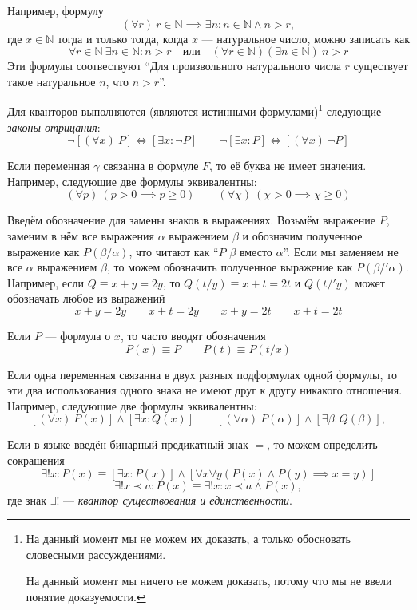 Например, формулу
\newcommand\N{\mathbb N}
\begin{equation}\label{eq:nat_unbound}
  (\forall r)~r\in\N\implies \exists n:n\in\N\land n>r,
\end{equation}
где $x\in\N$ тогда и только тогда, когда $x$ --- натуральное число, можно записать как
\[
  \forall r\in\N~\exists n\in\N:n>r\quad\text{или}\quad
  (\forall r\in\N)(\exists n\in\N)~n>r
\]
Эти формулы соотвествуют ``Для произвольного натурального числа
$r$ существует такое натуральное $n$, что $n>r$''.

Для кванторов выполняются (являются истинными формулами)\footnote{
  На данный момент мы не можем их доказать, а только
  обосновать словесными рассуждениями.

  На данный момент мы ничего не можем доказать, потому что мы не ввели
  понятие доказуемости.}
следующие {\it законы отрицания}:
\[
  \lnot[(\forall x)~P]\iff[\exists x:\lnot P]\qquad
  \lnot[\exists x:P]\iff[(\forall x)~\lnot P]
\]

Если переменная $\gamma$ связанна в формуле $F$, то её буква не имеет значения.
Например, следующие две формулы эквивалентны:
\[
  (\forall p)~(p>0\implies p \geq 0)\qquad
  (\forall \chi)~(\chi>0\implies \chi\geq 0)
\]

Введём обозначение для замены знаков в выражениях.
Возьмём выражение $P$, заменим в нём все выражения $\alpha$ выражением $\beta$ и
обозначим полученное выражение как $P(\beta/\alpha)$, что читают как
``$P$ $\beta$ вместо $\alpha$''.
Если мы заменяем не все $\alpha$ выражением $\beta$, то можем обозначить полученное
выражение как $P(\beta/'\alpha)$.
Например, если $Q\equiv x+y=2y$, то $Q(t/y)\equiv x+t=2t$ и $Q(t/'y)$ может
обозначать любое из выражений
\[
  x+y=2y\qquad x+t=2y\qquad x+y=2t\qquad x+t=2t
\]

Если $P$ --- формула о $x$, то часто вводят обозначения
\[
  P(x)\equiv P\qquad P(t)\equiv P(t/x)
\]

Если одна переменная связанна в двух разных подформулах
одной формулы, то эти два использования
одного знака не имеют друг к другу никакого отношения.
Например, следующие две формулы эквивалентны:
\[
  [(\forall x)~P(x)]\land[\exists x:Q(x)]\qquad
  [(\forall \alpha)~P(\alpha)]\land[\exists \beta:Q(\beta)],
\]

\label{page:exists_only}
Если в языке введён бинарный предикатный знак $=$, то
можем определить сокращения
\[
  \exists! x:P(x)\equiv[\exists x:P(x)]\land
  [\forall x\forall y(P(x)\land P(y)\implies x=y)]
\]
\[
  \exists! x\prec a:P(x)\equiv \exists! x:x\prec a\land P(x),
\]
где знак $\exists!$ --- {\it квантор существования и единственности}.

